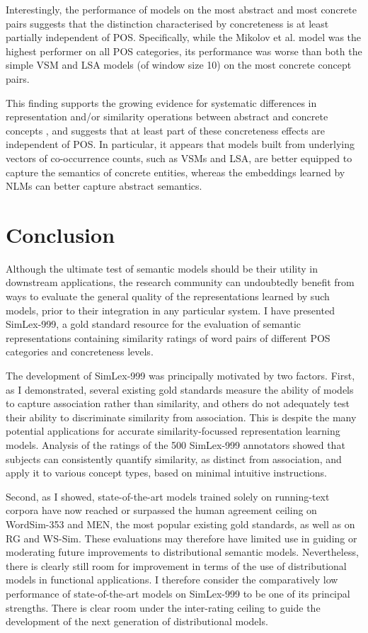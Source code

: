 Interestingly, the performance of models on the most abstract and most concrete pairs suggests that the distinction characterised by concreteness is at least partially independent of POS. Specifically, while the Mikolov et al. model was the highest performer on all POS categories, its performance was worse than both the simple VSM and LSA models (of window size 10) on the most concrete concept pairs.

This finding supports the growing evidence for systematic differences in representation and/or similarity operations between abstract and concrete concepts \citep{hill2013concreteness}, and suggests that at least part of these concreteness effects are independent of POS. In particular, it appears that models built from underlying vectors of co-occurrence counts, such as VSMs and LSA, are better equipped to capture the semantics of concrete entities, whereas the embeddings learned by NLMs can better capture abstract semantics. 

\section{Conclusion} 
\label{conclusion}
Although the ultimate test of semantic models should be their utility in downstream applications, the research community can undoubtedly benefit from ways to evaluate the general quality of the representations learned by such models, prior to their integration in any particular system. I have presented SimLex-999, a gold standard resource for the evaluation of semantic representations containing similarity ratings of word pairs of different POS categories and concreteness levels. 

The development of SimLex-999 was principally motivated by two factors. First, as I demonstrated, several existing gold standards measure the ability of models to capture association rather than similarity, and others do not adequately test their ability to discriminate similarity from association. This is despite the many potential applications for accurate similarity-focussed representation learning models. Analysis of the ratings of the 500 SimLex-999 annotators showed that subjects can consistently quantify similarity, as distinct from association, and apply it to various concept types, based on minimal intuitive instructions. 

Second, as I showed, state-of-the-art models trained solely on running-text corpora have now reached or surpassed the human agreement ceiling on WordSim-353 and MEN, the most popular existing gold standards, as well as on RG and WS-Sim. These evaluations may therefore have limited use in guiding or moderating future improvements to distributional semantic models. Nevertheless, there is clearly still room for improvement in terms of the use of distributional models in functional applications. I therefore consider the comparatively low performance of state-of-the-art models on SimLex-999 to be one of its principal strengths. There is clear room under the inter-rating ceiling to guide the development of the next generation of distributional models. 

